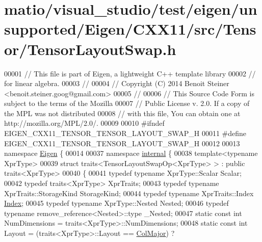 \hypertarget{matio_2visual__studio_2test_2eigen_2unsupported_2_eigen_2_c_x_x11_2src_2_tensor_2_tensor_layout_swap_8h_source}{}\section{matio/visual\+\_\+studio/test/eigen/unsupported/\+Eigen/\+C\+X\+X11/src/\+Tensor/\+Tensor\+Layout\+Swap.h}
\label{matio_2visual__studio_2test_2eigen_2unsupported_2_eigen_2_c_x_x11_2src_2_tensor_2_tensor_layout_swap_8h_source}

\begin{DoxyCode}
00001 \textcolor{comment}{// This file is part of Eigen, a lightweight C++ template library}
00002 \textcolor{comment}{// for linear algebra.}
00003 \textcolor{comment}{//}
00004 \textcolor{comment}{// Copyright (C) 2014 Benoit Steiner <benoit.steiner.goog@gmail.com>}
00005 \textcolor{comment}{//}
00006 \textcolor{comment}{// This Source Code Form is subject to the terms of the Mozilla}
00007 \textcolor{comment}{// Public License v. 2.0. If a copy of the MPL was not distributed}
00008 \textcolor{comment}{// with this file, You can obtain one at http://mozilla.org/MPL/2.0/.}
00009 
00010 \textcolor{preprocessor}{#ifndef EIGEN\_CXX11\_TENSOR\_TENSOR\_LAYOUT\_SWAP\_H}
00011 \textcolor{preprocessor}{#define EIGEN\_CXX11\_TENSOR\_TENSOR\_LAYOUT\_SWAP\_H}
00012 
00013 \textcolor{keyword}{namespace }\hyperlink{namespace_eigen}{Eigen} \{
00014 
00037 \textcolor{keyword}{namespace }\hyperlink{namespaceinternal}{internal} \{
00038 \textcolor{keyword}{template}<\textcolor{keyword}{typename} XprType>
00039 \textcolor{keyword}{struct }traits<TensorLayoutSwapOp<XprType> > : \textcolor{keyword}{public} traits<XprType>
00040 \{
00041   \textcolor{keyword}{typedef} \textcolor{keyword}{typename} XprType::Scalar Scalar;
00042   \textcolor{keyword}{typedef} traits<XprType> XprTraits;
00043   \textcolor{keyword}{typedef} \textcolor{keyword}{typename} XprTraits::StorageKind StorageKind;
00044   \textcolor{keyword}{typedef} \textcolor{keyword}{typename} XprTraits::Index \hyperlink{namespace_eigen_a62e77e0933482dafde8fe197d9a2cfde}{Index};
00045   \textcolor{keyword}{typedef} \textcolor{keyword}{typename} XprType::Nested Nested;
00046   \textcolor{keyword}{typedef} \textcolor{keyword}{typename} remove\_reference<Nested>::type \_Nested;
00047   \textcolor{keyword}{static} \textcolor{keyword}{const} \textcolor{keywordtype}{int} NumDimensions = traits<XprType>::NumDimensions;
00048   \textcolor{keyword}{static} \textcolor{keyword}{const} \textcolor{keywordtype}{int} Layout = (traits<XprType>::Layout == \hyperlink{group__enums_ggaacded1a18ae58b0f554751f6cdf9eb13a0cbd4bdd0abcfc0224c5fcb5e4f6669a}{ColMajor}) ? 

\end{DoxyCode}
